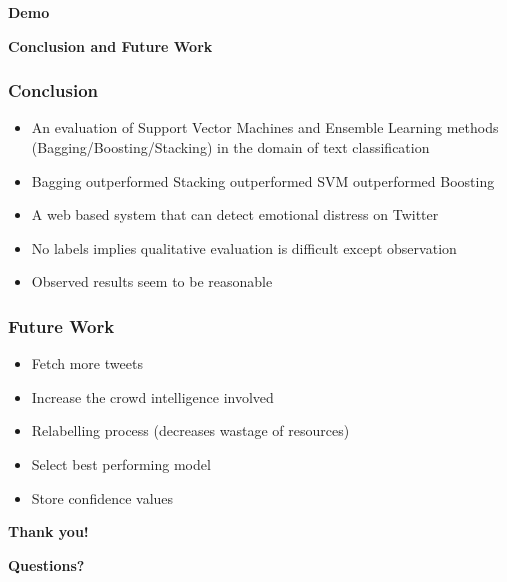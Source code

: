 \documentclass{beamer}
\begin{document}
    \begin{frame}
        \begin{center}
            \textbf{Demo}
        \end{center}
    \end{frame}
    
    \begin{frame}
        \begin{center}
            \textbf{Conclusion and Future Work}
        \end{center}
    \end{frame}
    
    \begin{frame}
        \frametitle{Conclusion}
        \begin{itemize}
            \item{An evaluation of Support Vector Machines and Ensemble Learning methods (Bagging/Boosting/Stacking) in the domain of text classification}
            \item{Bagging outperformed Stacking outperformed SVM outperformed Boosting}
            \pause
            \item{A web based system that can detect emotional distress on Twitter}
            \item{No labels implies qualitative evaluation is difficult except observation}
            \item{Observed results seem to be reasonable}
        \end{itemize}
    \end{frame}
    
    \begin{frame}
        \frametitle{Future Work}
        \begin{itemize}
            \item{Fetch more tweets}
            \item{Increase the crowd intelligence involved}
            \pause
            \item{Relabelling process (decreases wastage of resources)}
            \pause
            \item{Select best performing model}
            \item{Store confidence values}
        \end{itemize}
    \end{frame}
    
    \begin{frame}
        \begin{center}
            \textbf{Thank you!}
        \end{center}
        \begin{center}
            \textbf{Questions?}
        \end{center}
    \end{frame}
\end{document}
